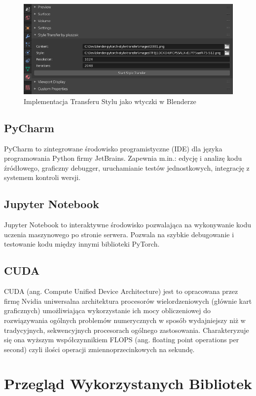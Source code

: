 \documentclass[brudnopis]{xmgr}
\begin{document}
\begin{figure}[!tbh]
\centering
\includegraphics[width=.8\hsize]{fig/9}
\caption{Implementacja Transferu Stylu jako wtyczki w Blenderze\label{RYS.9}}
\end{figure}

\section{PyCharm\label{s:dsssl}}
 PyCharm to zintegrowane środowisko programistyczne (IDE) dla języka programowania Python firmy JetBrains. Zapewnia m.in.: edycję i analizę kodu źródłowego, graficzny debugger, uruchamianie testów jednostkowych, integrację z systemem kontroli wersji. 
 
 \section{Jupyter Notebook\label{s:dsssl}}
 
Jupyter Notebook to interaktywne środowisko pozwalająca na wykonywanie kodu uczenia maszynowego po stronie serwera. Pozwala na szybkie debugowanie i testowanie kodu między innymi biblioteki PyTorch.

 \section{CUDA\label{s:dsssl}}
 
CUDA (ang. Compute Unified Device Architecture) jest to opracowana przez firmę Nvidia uniwersalna architektura procesorów wielordzeniowych (głównie kart graficznych) umożliwiająca wykorzystanie ich mocy obliczeniowej do rozwiązywania ogólnych problemów numerycznych w sposób wydajniejszy niż w tradycyjnych, sekwencyjnych procesorach ogólnego zastosowania. Charakteryzuje się ona wyższym współczynnikiem FLOPS (ang. floating point operations per second) czyli ilości operacji zmiennoprzecinkowych na sekundę.




\chapter{Przegląd Wykorzystanych Bibliotek}
\end{document}
